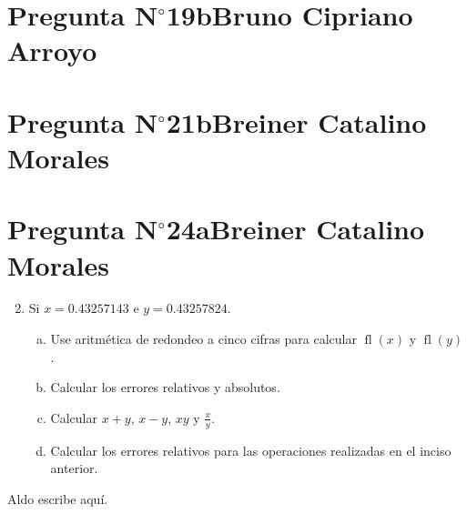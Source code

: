 \section{Pregunta N$^{\circ}$19b\qquad Bruno Cipriano Arroyo}
\section{Pregunta N$^{\circ}$21b\qquad Breiner Catalino Morales}
\section{Pregunta N$^{\circ}$24a\qquad Breiner Catalino Morales}



\begin{frame}

	\begin{enumerate}\setcounter{enumi}{1}
		\item

		      Si $x=0.43257143$ e $y=0.43257824$.

		      \begin{enumerate}[a)]
			      \item\label{q:2.a}

			      Use aritmética de redondeo a cinco cifras para calcular
			      \begin{math}
				      \operatorname{fl}\left(x\right)
			      \end{math}
			      y
			      \begin{math}
				      \operatorname{fl}\left(y\right)
			      \end{math}.

			      \item\label{q:2.b}

			      Calcular los errores relativos y absolutos.

			      \item\label{q:2.c}

			      Calcular $x+y$, $x-y$, $xy$ y $\frac{x}{y}$.

			      \item\label{q:2.d}

			      Calcular los errores relativos para las operaciones
			      realizadas en el inciso anterior.
		      \end{enumerate}
	\end{enumerate}

	\begin{solution}
		Aldo escribe aquí.
	\end{solution}
\end{frame}

